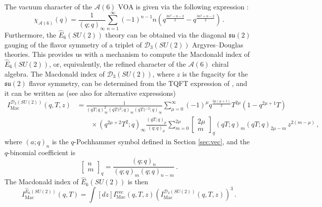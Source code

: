 \documentclass[12pt]{article}
\numberwithin{equation}{section}
\numberwithin{figure}{section}
\theoremstyle{plain}
\theoremstyle{definition}
\begin{document}
The vacuum character of the $\mathcal{A}(6)$ VOA is given via the following expression \cite{Feigin:2007sp,MR2766985,Buican:2016arp}:
\begin{equation}\label{eqn:A6character}
\chi_{\mathcal{A}(6)}(q) = \frac{1}{(q;q)_\infty}
\sum_{n=1}^{\infty} (-1)^{n-1} n
\left(
q^{\frac{3n^2 - n - 2}{2}} - q^{\frac{3n^2 + n - 2}{2}}
\right) \,.
\end{equation}
Furthermore, the $\widehat{E}_6(SU(2))$ theory can be obtained via the diagonal $\mathfrak{su}(2)$ gauging of the flavor symmetry of a triplet of $\mathcal{D}_3(SU(2))$ Argyres--Douglas theories. This provides us with a mechanism to compute the Macdonald index of $\widehat{E}_6(SU(2))$, or, equivalently, the refined character of the $\mathcal{A}(6)$ chiral algebra. The Macdonald index of $\mathcal{D}_3(SU(2))$, where $z$ is the fugacity for the $\mathfrak{su}(2)$ flavor symmetry, can be determined from the TQFT expression of \cite{Song:2015wta}, and it can be written as (see also \cite{Buican:2015tda, Andrews:2025krn, Andrews:2025tko, Kim:2025klh} for alternative expressions)
\begin{equation}\label{eqn:D3SU2Mac}
  \begin{aligned}
    I_\text{Mac}^{\mathcal{D}_3(SU(2))}(q, T, z) &= \frac{1}{(qT; q)_\infty^2 (qTz^2; q)_\infty (qTz^{-2}; q)_\infty} \sum_{\mu = 0}^\infty (-1)^\mu q^{\frac{3\mu(\mu+1)}{2}} T^{2\mu} (1 - q^{2\mu+1} T) \\
    &\qquad \times (q^{2\mu+2} T^2; q)_\infty \frac{(qT; q)_\mu}{(q; q)_\mu} \sum_{m=0}^{2\mu} \begin{bmatrix} 2\mu \\ m \end{bmatrix}_q (qT; q)_m (qT; q)_{2\mu - m} \, z^{2(m - \mu)} \,,
  \end{aligned}
\end{equation}
where $(a; q)_n$ is the $q$-Pochhammer symbol defined in Section \ref{sec:vec}, and the $q$-binomial coefficient is
\begin{equation}
    \begin{bmatrix} n \\ m \end{bmatrix}_q = \frac{(q; q)_n}{(q; q)_m (q; q)_{n-m}} \,.
\end{equation}
The Macdonald index of $\widehat{E}_6(SU(2))$ is then
\begin{equation}\label{eqn:refA6gauge}
    I_\text{Mac}^{\widehat{E}_6(SU(2))}(q, T) = \int [dz] I_\text{Mac}^{\text{vec}}(q, T, z) \left(I_\text{Mac}^{\mathcal{D}_3(SU(2))}(q, T, z)\right)^3 \,.
\end{equation}
\end{document}
